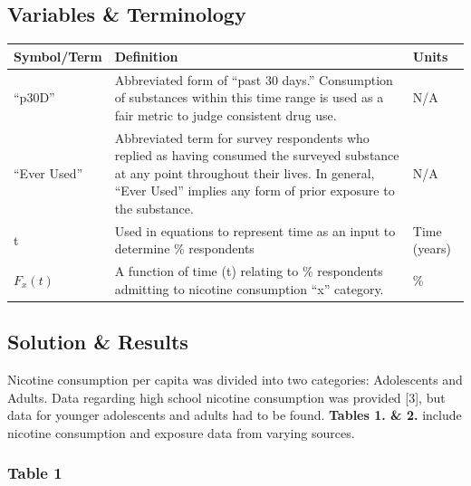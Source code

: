 \subsection{Variables \& Terminology}

\begin{center}
    \begin{tabular}{p{1.2in} p{4in} p{.5in}}
        \toprule
        \textbf{Symbol/Term} & \textbf{Definition} & \textbf{Units} \\
        \midrule
        “p30D” & Abbreviated form of “past 30 days.” Consumption of substances within this time range is used as a fair metric to judge consistent drug use. & N/A \\
        \midrule
        “Ever Used” & Abbreviated term for survey respondents who replied as having consumed the surveyed substance at any point throughout their lives. In general, “Ever Used” implies any form of prior exposure to the substance. & N/A \\
        \midrule
        t & Used in equations to represent time as an input to determine \% respondents & Time (years) \\
        \midrule
        \(F_x(t)\) & A function of time (t) relating to \% respondents admitting to nicotine consumption ``x'' category. & \% \\
        \bottomrule
    \end{tabular}
\end{center}

\subsection{Solution \& Results}

Nicotine consumption per capita was divided into two categories: Adolescents and Adults. Data regarding high school nicotine consumption was provided [3], but data for younger adolescents and adults had to be found. \textbf{Tables 1. \& 2.} include nicotine consumption and exposure data from varying sources.

\subsubsection*{Table 1}

